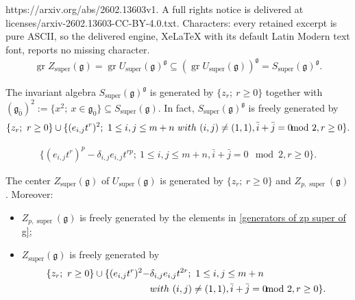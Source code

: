 \documentclass[10pt,a4paper]{amsart}
\DeclareMathOperator{\gr}{gr}
\DeclareMathOperator{\super}{super}
\newcommand{\fg}{\mathfrak{g}}
\begin{document}
https://arxiv.org/abs/2602.13603v1. A full rights notice is delivered at licenses/arxiv-2602.13603-CC-BY-4.0.txt. Characters: every retained excerpt is pure ASCII, so the delivered engine, XeLaTeX with its default Latin Modern text font, reports no missing character.
\begin{align}\label{grzsuper shuyu Ssuper gg}
\gr Z_{\super}(\fg)=\gr U_{\super}(\fg)^{\fg}\subseteq (\gr U_{\super}(\fg))^\fg=S_{\super}(\fg)^{\fg}.
\end{align}

\begin{Lemma}\label{Lem: invariant subalgebra S super gg}
The invariant algebra $S_{\super}(\fg)^\fg$ is generated by $\{z_r;~r\geq 0\}$ together with $(\fg_{\bar 0})^2:=\{x^2;~x\in\fg_{\bar 0}\}\subseteq S_{\super}(\fg)$.
In fact,
$S_{\super}(\fg)^\fg$ is freely generated by
\begin{align}\label{free generators of ssuper gg}
\{z_r;~r\geq 0\}\cup \{(e_{i,j}t^r)^2;~1\leq i, j\leq m+n~{\rm with}~(i,j)\neq (1,1), \bar i+\bar j=0\!\!\!\!\! \mod 2, r\geq 0\}.
\end{align}
\end{Lemma}

\begin{align}\label{generators of zp super of g}
\{(e_{i,j}t^r)^p-\delta_{i,j}e_{i,j}t^{rp};~1\leq i,j\leq m+n, \bar i+\bar j=0\!\!\!\!\! \mod 2, r\geq 0\}.    
\end{align}

\begin{Theorem}\label{theorem: center Zsuper g}
The center $Z_{\super}(\fg)$ of $U_{\super}(\fg)$ is generated by $\{z_r;~r\geq 0\}$ and $Z_{p,\super}(\fg)$.
Moreover:
\begin{itemize}
\item[(1)] $Z_{p,\super}(\fg)$ is freely generated by the elements in \eqref{generators of zp super of g};
\item[(2)] $Z_{\super}(\fg)$ is freely generated by 
\begin{align}\label{generators of zsuper g}
\{z_r;~r\geq 0\}\cup\{(e_{i,j}t^r)^2-&\delta_{i,j}e_{i,j}t^{2r};~1\leq i, j\leq m+n~\\\nonumber
&{\rm with}~(i,j)\neq (1,1), \bar i+\bar j=0\!\!\!\!\! \mod 2, r\geq 0\}.      
\end{align}

\end{itemize}
\end{Theorem}
\end{document}

